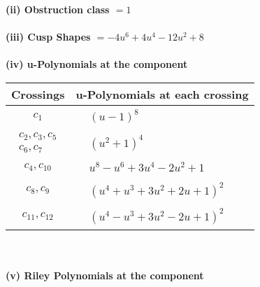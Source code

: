 \documentclass[1p]{elsarticle_modified}
\theoremstyle{definition}
\begin{document}
\flushleft \textbf{(ii) Obstruction class $= 1$}\\~\\
\flushleft \textbf{(iii) Cusp Shapes $= -4 u^6+4 u^4-12 u^2+8$}\\~\\
\newpage\renewcommand{\arraystretch}{1}
\flushleft \textbf{(iv) u-Polynomials at the component}\newline \\
\begin{tabular}{m{50pt}|m{274pt}}
Crossings & \hspace{64pt}u-Polynomials at each crossing \\
\hline $$\begin{aligned}c_{1}\end{aligned}$$&$\begin{aligned}
&(u-1)^8
\end{aligned}$\\
\hline $$\begin{aligned}c_{2},c_{3},c_{5}\\c_{6},c_{7}\end{aligned}$$&$\begin{aligned}
&(u^2+1)^4
\end{aligned}$\\
\hline $$\begin{aligned}c_{4},c_{10}\end{aligned}$$&$\begin{aligned}
&u^8- u^6+3 u^4-2 u^2+1
\end{aligned}$\\
\hline $$\begin{aligned}c_{8},c_{9}\end{aligned}$$&$\begin{aligned}
&(u^4+u^3+3 u^2+2 u+1)^2
\end{aligned}$\\
\hline $$\begin{aligned}c_{11},c_{12}\end{aligned}$$&$\begin{aligned}
&(u^4- u^3+3 u^2-2 u+1)^2
\end{aligned}$\\
\hline
\end{tabular}\\~\\
\newpage\renewcommand{\arraystretch}{1}
\flushleft \textbf{(v) Riley Polynomials at the component}\newline \\
\end{document}
